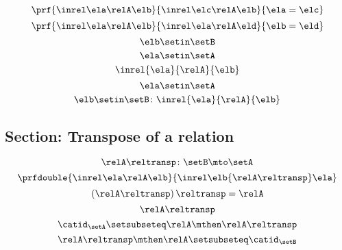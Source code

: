 \begin{forslides}
    \begin{equation}\label{eq:slides_session2_rel_126}
        \prf{
            \inrel \ela \relA \elb
        }{
            \inrel \elc \relA \elb
        }{
            \ela=\elc
        }
    \end{equation}
    \begin{equation}\label{eq:slides_session2_rel_127}
        \prf{
            \inrel \ela \relA \elb
        }{
            \inrel \ela \relA \eld
        }{
            \elb = \eld
        }
    \end{equation}
    \begin{equation}\label{eq:slides_session2_rel_128}
        \elb\setin \setB
    \end{equation}
    \begin{equation}\label{eq:slides_session2_rel_129}
        \ela\setin \setA
    \end{equation}
    \begin{equation}\label{eq:slides_session2_rel_130}
        \inrel{\ela}{\relA}{\elb}
    \end{equation}
    \begin{equation}\label{eq:slides_session2_rel_131}
        \ela\setin \setA
    \end{equation}
    \begin{equation}\label{eq:slides_session2_rel_132}
        \elb \setin \setB\colon \inrel{\ela}{\relA}{\elb}
    \end{equation}

    \subsection{Section: Transpose of a relation}

    \begin{equation}\label{eq:slides_session2_rel_133}
        \relA\reltransp\colon \setB \mto \setA
    \end{equation}
    \begin{equation}\label{eq:slides_session2_rel_134}
        \prfdouble{
            \inrel \ela \relA \elb
        }{
            \inrel \elb {\relA\reltransp} \ela
        }
    \end{equation}
    \begin{equation}\label{eq:slides_session2_rel_135}
        \left(\relA\reltransp\right)\reltransp = \relA
    \end{equation}
    \begin{equation}\label{eq:slides_session2_rel_136}
        \relA\reltransp
    \end{equation}
    \begin{equation}\label{eq:slides_session2_rel_137}
        \catid_\setA\setsubseteq \relA \mthen \relA\reltransp
    \end{equation}
    \begin{equation}\label{eq:slides_session2_rel_138}
        \relA\reltransp\mthen \relA\setsubseteq \catid_\setB
    \end{equation}


\end{forslides}

